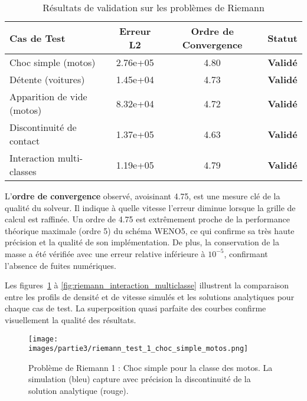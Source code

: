 \begin{table}[htbp]
    \centering
    \caption{Résultats de validation sur les problèmes de Riemann}
    \label{tab:riemann_validation_results}
    \begin{tabular}{|l|c|c|c|}
        \hline
        \textbf{Cas de Test}       & \textbf{Erreur L2} & \textbf{Ordre de Convergence} & \textbf{Statut} \\
        \hline
        Choc simple (motos)        & 2.76e+05           & 4.80                          & \textbf{Validé} \\
        Détente (voitures)         & 1.45e+04           & 4.73                          & \textbf{Validé} \\
        Apparition de vide (motos) & 8.32e+04           & 4.72                          & \textbf{Validé} \\
        Discontinuité de contact   & 1.37e+05           & 4.63                          & \textbf{Validé} \\
        Interaction multi-classes  & 1.19e+05           & 4.79                          & \textbf{Validé} \\
        \hline
    \end{tabular}
\end{table}

L'\textbf{ordre de convergence} observé, avoisinant 4.75, est une mesure clé de la qualité du solveur. Il indique à quelle vitesse l'erreur diminue lorsque la grille de calcul est raffinée. Un ordre de 4.75 est extrêmement proche de la performance théorique maximale (ordre 5) du schéma WENO5, ce qui confirme sa très haute précision et la qualité de son implémentation. De plus, la conservation de la masse a été vérifiée avec une erreur relative inférieure à $10^{-5}$, confirmant l'absence de fuites numériques.

Les figures~\ref{fig:riemann_choc_simple} à \ref{fig:riemann_interaction_multiclasse} illustrent la comparaison entre les profils de densité et de vitesse simulés et les solutions analytiques pour chaque cas de test. La superposition quasi parfaite des courbes confirme visuellement la qualité des résultats.

\begin{figure}[htbp]
    \centering
    \texttt{[image: images/partie3/riemann\_test\_1\_choc\_simple\_motos.png]}
    \caption{Problème de Riemann 1 : Choc simple pour la classe des motos. La simulation (bleu) capture avec précision la discontinuité de la solution analytique (rouge).}
    \label{fig:riemann_choc_simple}
\end{figure}

